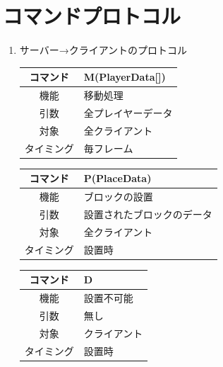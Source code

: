 \documentclass{jarticle}
\begin{document}
\section{コマンドプロトコル}

\begin{enumerate}
    \item サーバー→クライアントのプロトコル
    \begin{table}[h]
        \label{table:command1-1}
        \begin{center}
            \begin{tabular}{|c||p{30em}|}\hline
                コマンド&M(PlayerData[])\\\hline
                機能&移動処理\\
                引数&全プレイヤーデータ\\
                対象&全クライアント\\
                タイミング&毎フレーム\\\hline
            \end{tabular}
        \end{center}
    \end{table}
    \begin{table}[h]
        \label{table:command1-2}
        \begin{center}
            \begin{tabular}{|c||p{30em}|}\hline
                コマンド&P(PlaceData)\\\hline
                機能&ブロックの設置\\
                引数&設置されたブロックのデータ\\
                対象&全クライアント\\
                タイミング&設置時\\\hline
            \end{tabular}
        \end{center}
    \end{table}
    \begin{table}[h]
        \label{table:command1-3}
        \begin{center}
            \begin{tabular}{|c||p{30em}|}\hline
                コマンド&D\\\hline
                機能&設置不可能\\
                引数&無し\\
                対象&クライアント\\
                タイミング&設置時\\\hline

\end{tabular}
\end{center}
\end{table}
\end{enumerate}
\end{document}
